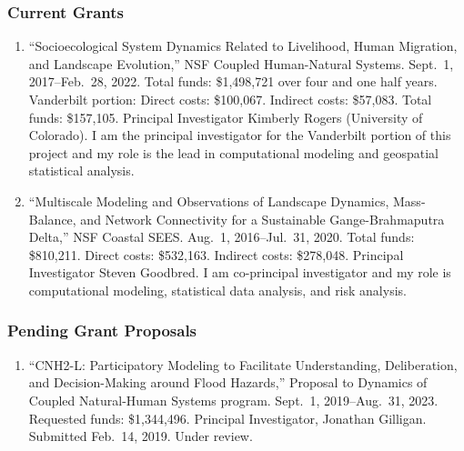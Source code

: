 %
%
\subsubsection{Current Grants}
\begin{enumerate}
    \item ``Socioecological System Dynamics Related to Livelihood, Human Migration, and Landscape Evolution,'' NSF Coupled Human-Natural Systems. Sept.~1, 2017--Feb.~28, 2022. Total funds: \$1,498,721 over four and one half years. Vanderbilt portion: Direct costs: \$100,067. Indirect costs: \$57,083. Total funds: \$157,105. Principal Investigator Kimberly Rogers (University of Colorado). I am the principal investigator for the Vanderbilt portion of this project and my role is the lead in computational modeling and geospatial statistical analysis.
	\item ``Multiscale Modeling and Observations of Landscape Dynamics, Mass-Balance, and Network Connectivity for a Sustainable Gange-Brahmaputra Delta,'' NSF Coastal SEES. Aug.~1, 2016--Jul.~31, 2020. Total funds: \$810,211. Direct costs: \$532,163. Indirect costs: \$278,048. Principal Investigator Steven Goodbred. I am co-principal investigator and my role is computational modeling, statistical data analysis, and risk analysis.
\end{enumerate}
\subsubsection{Pending Grant Proposals}
\begin{enumerate}
    \item ``CNH2-L: Participatory Modeling to Facilitate Understanding, Deliberation, and Decision-Making around Flood Hazards,'' Proposal to Dynamics of Coupled Natural-Human Systems program. Sept.~1, 2019--Aug.~31, 2023. Requested funds: \$1,344,496. Principal Investigator, Jonathan Gilligan. Submitted Feb.~14, 2019. Under review.
\end{enumerate}
